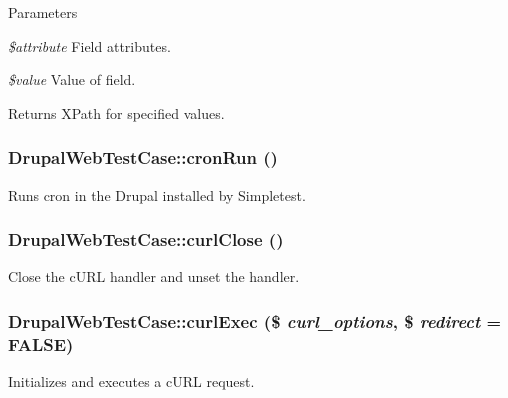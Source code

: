 \begin{DoxyParams}{Parameters}
\item[{\em \$attribute}]Field attributes. \item[{\em \$value}]Value of field. \end{DoxyParams}
\begin{DoxyReturn}{Returns}
XPath for specified values. 
\end{DoxyReturn}
\hypertarget{classDrupalWebTestCase_a74fdd4b3de72a3b340c3d6168a99d72c}{
\subsubsection[{cronRun}]{\setlength{\rightskip}{0pt plus 5cm}DrupalWebTestCase::cronRun ()}}
\label{classDrupalWebTestCase_a74fdd4b3de72a3b340c3d6168a99d72c}
Runs cron in the Drupal installed by Simpletest. \hypertarget{classDrupalWebTestCase_a0b3eb01ee1312ea28f78fc1a293835be}{
\subsubsection[{curlClose}]{\setlength{\rightskip}{0pt plus 5cm}DrupalWebTestCase::curlClose ()}}
\label{classDrupalWebTestCase_a0b3eb01ee1312ea28f78fc1a293835be}
Close the cURL handler and unset the handler. \hypertarget{classDrupalWebTestCase_a8e9057a571cc788067f42a1a03ae21dc}{
\subsubsection[{curlExec}]{\setlength{\rightskip}{0pt plus 5cm}DrupalWebTestCase::curlExec (\$ {\em curl\_\-options}, \/  \$ {\em redirect} = {\ttfamily FALSE})}}
\label{classDrupalWebTestCase_a8e9057a571cc788067f42a1a03ae21dc}
Initializes and executes a cURL request.


